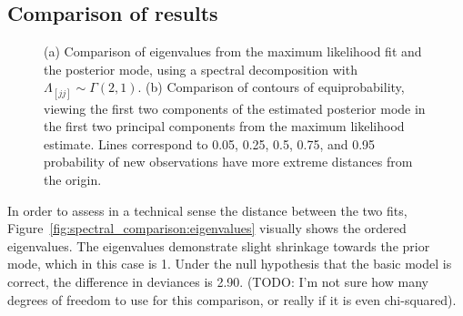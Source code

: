 \documentclass[10pt]{article}
\begin{document}
\subsection{Comparison of results}

\begin{figure}
\begin{center}
\end{center}
\caption{(a) Comparison of eigenvalues from the maximum likelihood fit and
  the posterior mode, using a spectral decomposition with
  $\Lambda_{[jj]} \sim \Gamma(2, 1)$. (b) Comparison of contours of equiprobability, viewing the first
  two components of the estimated posterior mode in the first two
  principal components from the maximum likelihood estimate. Lines
  correspond to 0.05, 0.25, 0.5, 0.75, and 0.95 probability of new
  observations have more extreme distances from the origin.
}
\label{fig:spectral_comparison}
\end{figure}

In order to assess in a technical sense the distance between the two
fits, Figure~\ref{fig:spectral_comparison:eigenvalues} visually shows the ordered eigenvalues. The eigenvalues demonstrate slight shrinkage
towards the prior mode, which in this case is 1. Under the null
hypothesis that the basic model is correct, the difference in
deviances is 2.90. (TODO: I'm not sure how many degrees of freedom to use
for this comparison, or really if it is even chi-squared).
\end{document}
